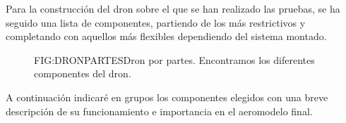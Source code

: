 
Para la construcción del dron sobre el que se han realizado las pruebas, se ha seguido una lista de componentes, partiendo de los más restrictivos y completando con aquellos más flexibles dependiendo del sistema montado.
 
\begin{figure}[Dron básico]{FIG:DRONPARTES}{Dron por partes. Encontramos los diferentes componentes del dron.}
\end{figure}

A continuación indicaré en grupos los componentes elegidos con una breve descripción de su funcionamiento e importancia en el aeromodelo final.